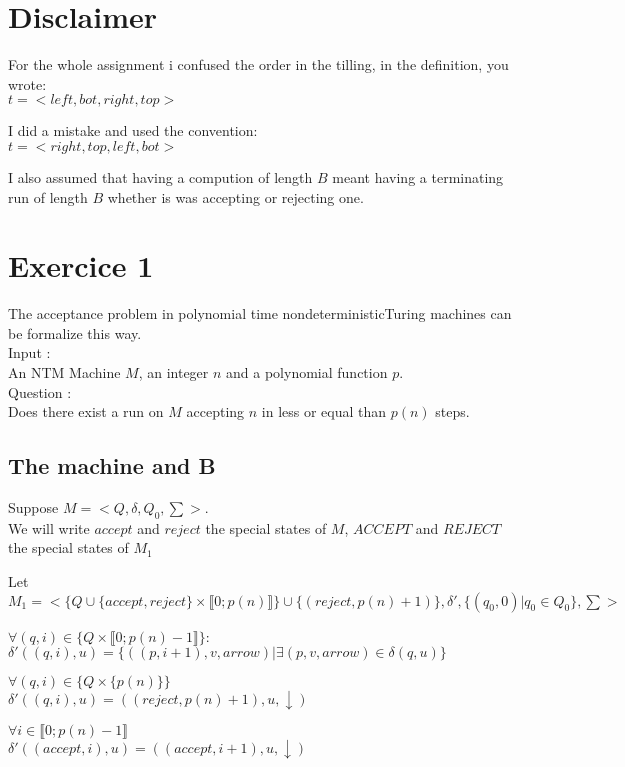 \section{Disclaimer}
For the whole assignment i confused the order in the tilling, in the definition, you wrote:
\\$t = <left,bot,right,top>$

I did a mistake and used the convention:
\\$t = <right,top,left,bot>$

I also assumed that having a compution of length $B$ meant having a terminating run of length $B$ whether is was accepting or rejecting one.
 
\section{Exercice 1}
The  acceptance problem in polynomial time nondeterministicTuring machines can be formalize this way.
\\Input : 
\\ An NTM Machine $M$, an integer $n$ and a polynomial function $p$.
\\Question :
\\ Does there exist a run on $M$ accepting $n$ in less or equal than $p(n)$ steps.

\subsection{The machine and B}

Suppose $M = <Q,\delta,Q_0,\sum>$. 
\\We will write $accept$ and $reject$ the special states of $M$, $ACCEPT$ and $REJECT$ the special states of $M_1$

Let $M_1 = <\{Q\cup \{ accept,reject\}\times  \llbracket 0;p(n) \rrbracket\} \cup \{(reject,p(n)+1)\}, \delta',\{(q_0,0) | q_0 \in Q_0\},\sum>$

$\forall (q,i) \in \{Q \times  \llbracket 0;p(n)-1 \rrbracket\}$:
\\$\delta'((q,i),u) = \{((p,i+1),v,arrow)|\exists (p,v,arrow)\in \delta(q,u)\} $

$\forall (q,i) \in \{Q\times \{p(n)\}\}$
\\$\delta'((q,i),u) = ((reject,p(n)+1),u,\downarrow)$

$\forall i \in \llbracket 0;p(n)-1 \rrbracket$
\\$\delta'((accept,i),u) = ((accept,i+1),u,\downarrow)$

